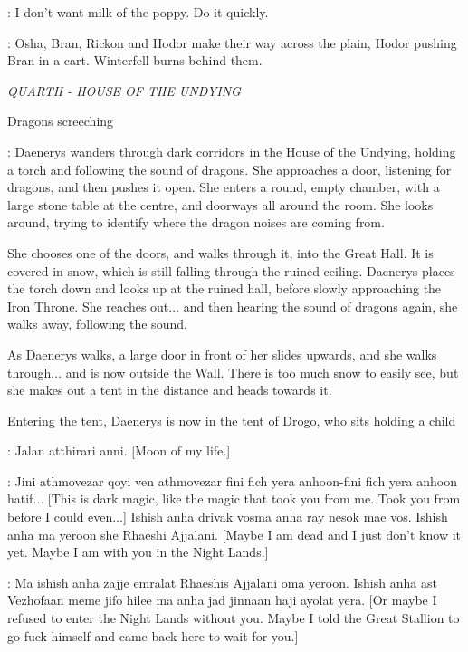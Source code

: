 \LUWIN: I don't want milk of the poppy.  Do it quickly. 


\NARRATOR: Osha, Bran, Rickon and Hodor make their way across the plain, Hodor pushing Bran in a cart. Winterfell burns behind them.


\scene

\textit{QUARTH - HOUSE OF THE UNDYING} 

\sfx Dragons screeching


\NARRATOR: Daenerys wanders through dark corridors in the House of the Undying, holding a torch and following the sound of dragons. She approaches a door, listening for dragons, and then pushes it open. She enters a round, empty chamber, with a large stone table at the centre, and doorways all around the room. She looks around, trying to identify where the dragon noises are coming from. 

\n She chooses one of the doors, and walks through it, into the Great Hall. It is covered in snow, which is still falling through the ruined ceiling. Daenerys places the torch down and looks up at the ruined hall, before slowly approaching the Iron Throne. She reaches out$\ldots$ and then hearing the sound of dragons again, she walks away, following the sound. 

\n As Daenerys walks, a large door in front of her slides upwards, and she walks through$\ldots$ and is now outside the Wall. There is too much snow to easily see, but she makes out a tent in the distance and heads towards it. 

\n Entering the tent, Daenerys is now in the tent of Drogo, who sits holding a child

\DROGO: Jalan atthirari anni. [Moon of my life.] 


\DAENERYS: Jini athmovezar qoyi ven athmovezar fini fich yera anhoon-fini fich yera anhoon hatif$\ldots$ [This is dark magic, like the magic that took you from me. Took you from before I could even$\ldots$] Ishish anha drivak vosma anha ray nesok mae vos. Ishish anha ma yeroon she Rhaeshi Ajjalani. [Maybe I am dead and I just don't know it yet. Maybe I am with you in the Night Lands.] 

\DROGO: Ma ishish anha zajje emralat Rhaeshis Ajjalani oma yeroon. Ishish anha ast Vezhofaan meme jifo hilee ma anha jad jinnaan haji ayolat yera. [Or maybe I refused to enter the Night Lands without you. Maybe I told the Great Stallion to go fuck himself and came back here to wait for you.]  

